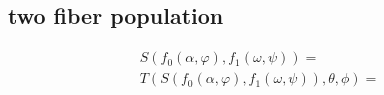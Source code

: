 \subsection{two fiber population}
\begin{align*}
    S(f_0(\alpha, \varphi), f_1(\omega, \psi)) = \\
    T(S(f_0(\alpha, \varphi), f_1(\omega, \psi)), \theta, \phi) = 
\end{align*}
% 
% 
% 
